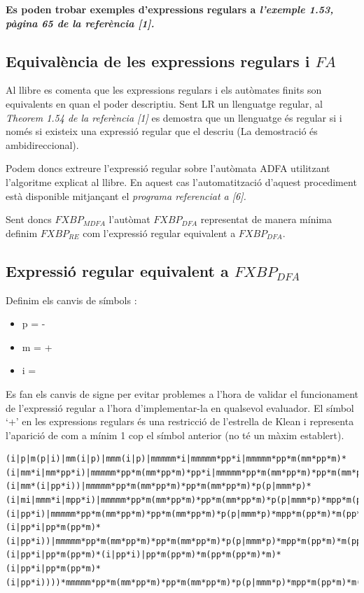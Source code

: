 \documentclass[12pt,a4paper]{report}
\def \dfa{$FXBP_{DFA} $}
\def \mfa{$FXBP_{MDFA} $}
\def \re{$FXBP_{RE} $}
\begin{document}
\textbf{Es poden trobar exemples d’expressions regulars a \textit{l’exemple 1.53, pàgina 65 de la referència [1].}}

\subsection{Equivalència de les expressions regulars i $FA$}

Al llibre es comenta que les expressions regulars i els autòmates finits son equivalents en quan el poder descriptiu. Sent LR un llenguatge regular, al \textit{Theorem 1.54 de la referència [1]} es demostra que un llenguatge és regular si i només si existeix una expressió regular que el descriu (La demostració és ambidireccional).

Podem doncs extreure l’expressió regular sobre l’autòmata ADFA utilitzant l’algoritme explicat al llibre. En aquest cas l’automatització d’aquest procediment està disponible mitjançant el \textit{programa referenciat a [6].}

Sent doncs \mfa{} l’autòmat \dfa{} representat de manera mínima definim \re{} com l’expressió regular equivalent a \dfa{}. 

\subsection{Expressió regular equivalent a \dfa{}}

Definim els canvis de símbols : 

\begin{itemize}
\item p = -
\item m = +
\item i = \Return
\end{itemize}

Es fan els canvis de signe per evitar problemes a l’hora de validar el funcionament de l’expressió regular a l’hora d’implementar-la en qualsevol evaluador. El símbol ‘+’ en les expressions regulars és una restricció de l’estrella de Klean i representa l’aparició de com a mínim 1 cop el símbol anterior (no té un màxim establert). 


\begin{lstlisting}
(i|p|m(p|i)|mm(i|p)|mmm(i|p)|mmmmm*i|mmmmm*pp*i|mmmmm*pp*m(mm*pp*m)*(i|mm*i|mm*pp*i)|mmmmm*pp*m(mm*pp*m)*pp*i|mmmmm*pp*m(mm*pp*m)*pp*m(mm*pp*m)*(i|mm*(i|pp*i))|mmmmm*pp*m(mm*pp*m)*pp*m(mm*pp*m)*p(p|mmm*p)*(i|mi|mmm*i|mpp*i)|mmmmm*pp*m(mm*pp*m)*pp*m(mm*pp*m)*p(p|mmm*p)*mpp*m(pp*m)*(i|pp*i)|mmmmm*pp*m(mm*pp*m)*pp*m(mm*pp*m)*p(p|mmm*p)*mpp*m(pp*m)*m(pp*m(pp*m)*m)*(i|pp*i|pp*m(pp*m)*(i|pp*i))|mmmmm*pp*m(mm*pp*m)*pp*m(mm*pp*m)*p(p|mmm*p)*mpp*m(pp*m)*m(pp*m(pp*m)*m)*m(pp*m(pp*m)*m(pp*m(pp*m)*m)*m)*(i|pp*i|pp*m(pp*m)*(i|pp*i)|pp*m(pp*m)*m(pp*m(pp*m)*m)*(i|pp*i|pp*m(pp*m)*(i|pp*i))))*mmmmm*pp*m(mm*pp*m)*pp*m(mm*pp*m)*p(p|mmm*p)*mpp*m(pp*m)*m(pp*m(pp*m)*m)*m(pp*m(pp*m)*m(pp*m(pp*m)*m)*m)*m(i|m|p)*
\end{lstlisting}
\end{document}
